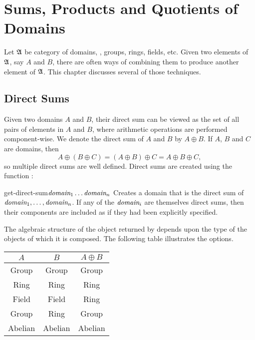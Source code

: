 \chapter{Sums, Products and Quotients of Domains}
\label{Quotients:Chap}

Let $\frak A$ be category of domains, \eg, groups, rings, fields, etc.
Given two elements of $\frak A$, say $A$ and $B$, there are often ways
of combining them to produce another element of $\frak A$.  This
chapter discusses several of those techniques. 

\section{Direct Sums}
\label{Direct:Sum:Sec}

Given two domains $A$ and $B$, their direct sum can be viewed as the
set of all pairs of elements in $A$ and $B$, where arithmetic
operations are performed component-wise.  We denote the direct sum
of $A$ and $B$ by $A \oplus B$.  If $A$, $B$ and $C$ are domains, then
\[
A \oplus ( B \oplus C) = (A \oplus B) \oplus C = A \oplus B \oplus C,
\]
so multiple direct sums are well defined.  Direct sums are
created using the function :

\begin{functiondef}{get-direct-sum}{$\mbox{\em domain}_1 \ldots
\mbox{\em domain}_n$}
Creates a domain that is the direct sum of $\mbox{\em domain}_1,
\ldots, \mbox{\em domain}_n$.  If any of the $\mbox{\em domain}_i$ are
themselves direct sums, then their components are included as if they
had been explicitly specified.
\end{functiondef}

The algebraic structure of the object returned by 
depends upon the type of the objects of which it is composed.  The
following table illustrates the options.

\begin{center}
\begin{tabular}{||c|c|c||}
\multicolumn{1}{c}{$A$} & \multicolumn{1}{c}{$B$} & 
   \multicolumn{1}{c}{$A \oplus B$} \\ \hline
Group & Group & Group \\ \hline
Ring & Ring & Ring \\ \hline
Field & Field  & Ring \\ \hline 
Group & Ring & Group \\ \hline 
Abelian & Abelian & Abelian \\ \hline 
\end{tabular} 
\end{center}

